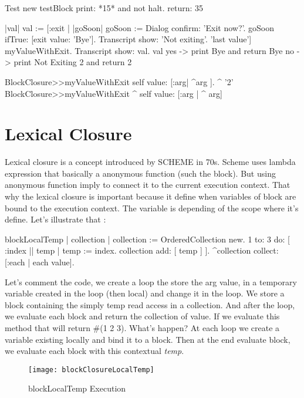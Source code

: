 \documentclass[a4paper,10pt,twoside]{book}
\begin{document}
\begin{code}{}
Test new testBlock 	
print: *15* and not halt. 
return: 35
\end{code}


\begin{code}{}
|val|
val := [:exit |
		|goSoon|
		goSoon := Dialog confirm: 'Exit now?'.
		goSoon ifTrue: [exit value: 'Bye'].
		Transcript show: 'Not exiting'.
		'last value'] myValueWithExit.
Transcript show: val.
val
yes -> print Bye and return  Bye
no -> print Not Exiting 2 and return 2
\end{code}

\begin{code}{}
BlockClosure>>myValueWithExit
	      self value: [:arg| ^arg ].
      ^ '2'
BlockClosure>>myValueWithExit
 ^ self value: [:arg | ^ arg]        
\end{code}


\section{Lexical Closure}
Lexical closure is a concept introduced by SCHEME in 70s. Scheme uses lambda expression that basically a anonymous function (such the block). But using anonymous function imply to connect it to the current execution context. That why the lexical closure is important because it define when variables of block are bound to the execution context. The variable is depending of the scope where it's define. Let's illustrate that :

\begin{code}{}
blockLocalTemp
	| collection |
		collection := OrderedCollection new.
		1 to: 3 do: [ :index || temp |
			temp := index. 
			collection add: [ temp ] ].
		^collection collect: [:each | each value].
\end{code}

Let's comment the code, we create a loop the store the arg value, in a temporary variable created in the loop (then local) and change it in the loop. We store a block containing the simply temp read access in a collection. And after the loop, we evaluate each block and return the collection of value.
If we evaluate this method that will return \#(1 2 3). What's happen? At each loop we create a variable existing locally and bind it to a block. Then at the end evaluate block, we evaluate each block with this contextual \emph{temp}. 

\begin{figure}[htbp]
	\centering
        \texttt{[image: blockClosureLocalTemp]}
	\caption{blockLocalTemp Execution}
	\label{fig:blockLocalTempExecution}
\end{figure}
\end{document}
